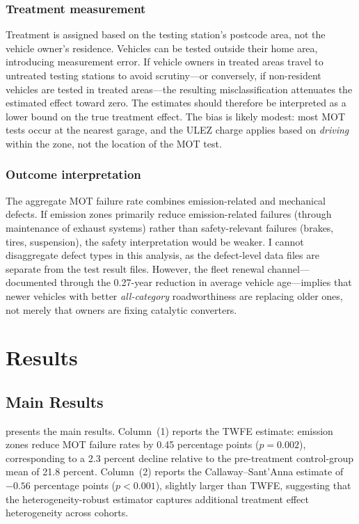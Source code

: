 \documentclass[12pt]{article}
\begin{document}
\subsubsection*{Treatment measurement} Treatment is assigned based on the testing station's postcode area, not the vehicle owner's residence. Vehicles can be tested outside their home area, introducing measurement error. If vehicle owners in treated areas travel to untreated testing stations to avoid scrutiny---or conversely, if non-resident vehicles are tested in treated areas---the resulting misclassification attenuates the estimated effect toward zero. The estimates should therefore be interpreted as a lower bound on the true treatment effect. The bias is likely modest: most MOT tests occur at the nearest garage, and the ULEZ charge applies based on \textit{driving} within the zone, not the location of the MOT test.

\subsubsection*{Outcome interpretation} The aggregate MOT failure rate combines emission-related and mechanical defects. If emission zones primarily reduce emission-related failures (through maintenance of exhaust systems) rather than safety-relevant failures (brakes, tires, suspension), the safety interpretation would be weaker. I cannot disaggregate defect types in this analysis, as the defect-level data files are separate from the test result files. However, the fleet renewal channel---documented through the 0.27-year reduction in average vehicle age---implies that newer vehicles with better \textit{all-category} roadworthiness are replacing older ones, not merely that owners are fixing catalytic converters.


\section{Results}

\subsection{Main Results}



 presents the main results. Column~(1) reports the TWFE estimate: emission zones reduce MOT failure rates by 0.45 percentage points ($p = 0.002$), corresponding to a 2.3 percent decline relative to the pre-treatment control-group mean of 21.8 percent. Column~(2) reports the Callaway--Sant'Anna estimate of $-0.56$ percentage points ($p < 0.001$), slightly larger than TWFE, suggesting that the heterogeneity-robust estimator captures additional treatment effect heterogeneity across cohorts.
\end{document}
